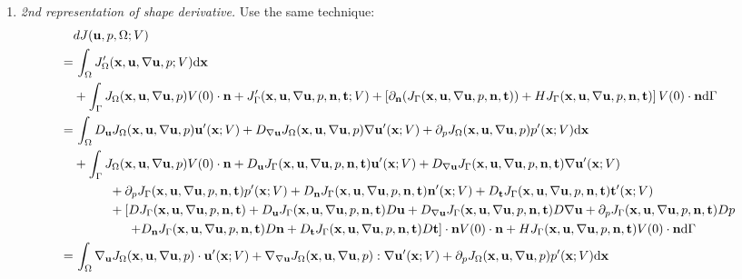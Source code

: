 \documentclass[oneside]{book}
\numberwithin{equation}{section}
\begin{document}
\begin{enumerate}[leftmargin=0in]
    \item \textit{2nd representation of shape derivative.} Use the same technique:
    \begin{align*}
        &dJ({\bf u},p,\Omega;V)\\
        =&\, \int_\Omega J_\Omega'({\bf x},{\bf u},\nabla{\bf u},p;V){\rm d}{\bf x}\\
        &+ \int_\Gamma J_\Omega({\bf x},{\bf u},\nabla{\bf u},p)V(0)\cdot{\bf n} + J_\Gamma'({\bf x},{\bf u},\nabla{\bf u},p,{\bf n},{\bf t};V) + \left[\partial_{\bf n}(J_\Gamma({\bf x},{\bf u},\nabla{\bf u},p,{\bf n},{\bf t})) + HJ_\Gamma({\bf x},{\bf u},\nabla{\bf u},p,{\bf n},{\bf t})\right]V(0)\cdot{\bf n}{\rm d}\Gamma\\
        =&\, \int_\Omega D_{\bf u}J_\Omega({\bf x},{\bf u},\nabla{\bf u},p){\bf u}'({\bf x};V) + D_{\nabla{\bf u}}J_\Omega({\bf x},{\bf u},\nabla{\bf u},p)\nabla{\bf u}'({\bf x};V) + \partial_pJ_\Omega({\bf x},{\bf u},\nabla{\bf u},p)p'({\bf x};V){\rm d}{\bf x}\\
        &+ \int_\Gamma J_\Omega({\bf x},{\bf u},\nabla{\bf u},p)V(0)\cdot{\bf n} + D_{\bf u}J_\Gamma({\bf x},{\bf u},\nabla{\bf u},p,{\bf n},{\bf t}){\bf u}'({\bf x};V) + D_{\nabla{\bf u}}J_\Gamma({\bf x},{\bf u},\nabla{\bf u},p,{\bf n},{\bf t})\nabla{\bf u}'({\bf x};V)\\
        &\hspace{1cm}+ \partial_pJ_\Gamma({\bf x},{\bf u},\nabla{\bf u},p,{\bf n},{\bf t})p'({\bf x};V) + D_{\bf n}J_\Gamma({\bf x},{\bf u},\nabla{\bf u},p,{\bf n},{\bf t}){\bf n}'({\bf x};V) + D_{\bf t}J_\Gamma({\bf x},{\bf u},\nabla{\bf u},p,{\bf n},{\bf t}){\bf t}'({\bf x};V)\\
        &\hspace{1cm}+ \left[DJ_\Gamma({\bf x},{\bf u},\nabla{\bf u},p,{\bf n},{\bf t}) + D_{\bf u}J_\Gamma({\bf x},{\bf u},\nabla{\bf u},p,{\bf n},{\bf t})D{\bf u} + D_{\nabla{\bf u}}J_\Gamma({\bf x},{\bf u},\nabla{\bf u},p,{\bf n},{\bf t})D\nabla{\bf u} + \partial_pJ_\Gamma({\bf x},{\bf u},\nabla{\bf u},p,{\bf n},{\bf t})Dp\right.\\
        &\hspace{15mm} \left.+ D_{\bf n}J_\Gamma({\bf x},{\bf u},\nabla{\bf u},p,{\bf n},{\bf t})D{\bf n} + D_{\bf t}J_\Gamma({\bf x},{\bf u},\nabla{\bf u},p,{\bf n},{\bf t})D{\bf t}\right]\cdot{\bf n}V(0)\cdot{\bf n} + HJ_\Gamma({\bf x},{\bf u},\nabla{\bf u},p,{\bf n},{\bf t})V(0)\cdot{\bf n}{\rm d}\Gamma\\
        =&\, \int_\Omega \nabla_{\bf u}J_\Omega({\bf x},{\bf u},\nabla{\bf u},p)\cdot{\bf u}'({\bf x};V) + \nabla_{\nabla{\bf u}}J_\Omega({\bf x},{\bf u},\nabla{\bf u},p):\nabla{\bf u}'({\bf x};V) + \partial_pJ_\Omega({\bf x},{\bf u},\nabla{\bf u},p)p'({\bf x};V){\rm d}{\bf x}\\

\end{align*}
\end{enumerate}
\end{document}
